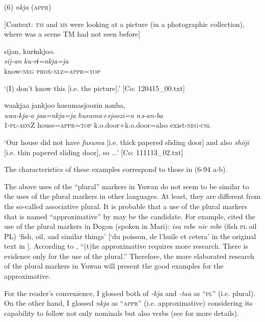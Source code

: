 (6)  \textit{nkja} (\textsc{appr})

  [Context: \textsc{tm} and \textsc{ms} were looking at a picture (in a photographic collection), where was a scene TM had not seen before]

 \ea {\TM}  sijan,  kurɨnkjoo.\\
\gll \textit{sij-an}  \textit{ku-rɨ=nkja=ja}\\

      know-\textsc{neg}  \textsc{prox}-\textsc{nlz}=\textsc{appr}=\textsc{top}

\glt ‘(I) don’t know this [i.e. the picture].’ [Co: 120415\_00.txt]
\z

 \ex {\TM}  waakjaa  jankjoo  {\textbar}husumasjoozi{\textbar}n  nənba,\\
\gll \textit{waa-kja-a}  \textit{jaa=nkja=ja}  \textit{husuma+sjoozi=n}  \textit{nə-an-ba}\\

      1-\textsc{pl}-\textsc{adn}Z  house=\textsc{appr}=\textsc{top}  k.o.door+k.o.door=also  exist-\textsc{neg}-\textsc{csl}

\glt ‘Our house did not have \textit{fusuma} [i.e. thick papered sliding door] and also \textit{shōji} [i.e. thin papered sliding door], so ...’ [Co: 111113\_02.txt]
\z

The characteristics of these examples correspond to those in (6-94 a-b).

  The above uses of the “plural” markers in Yuwan do not seem to be similar to the uses of the plural markers in other languages. At least, they are different from the so-called associative plural. It is probable that a use of the plural markers that is named “approximative” by \citet[239-240]{Corbett2000} may be the candidate. For example, \citet[239]{Corbett2000} cited the use of the plural markers in Dogon (spoken in Mari): \textit{isu} \textit{mbe} \textit{nie} \textit{mbe} (fish \textsc{pl} oil PL) ‘fish, oil, and similar things’ [‘du poisson, de l’huile et cetera’ in the original text in \citet[11]{Plungian1995}]. According to \citet[240]{Corbett2000}, “(t)he approximative requires more research. There is evidence only for the use of the plural.” Therefore, the more elaborated research of the plural markers in Yuwan will present the good examples for the approximative.

  For the reader’s convenience, I glossed both of \textit{{}-kja} and \textit{{}-taa} as “\textsc{pl}” (i.e. plural). On the other hand, I glossed \textit{nkja} as “\textsc{appr}” (i.e. approximative) considering its capability to follow not only nominals but also verbs (see  for more details).

